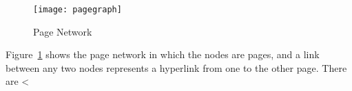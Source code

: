 \documentclass{scrartcl}
\begin{document}
\begin{figure}[htbp]
	\centering
	\texttt{[image: pagegraph]}
	\caption{Page Network}
	\label{fig:page_network}
\end{figure}

Figure~\ref{fig:page_network} shows the page network in which the nodes are pages, and a link between any two nodes represents a hyperlink from one to the other page. There are <%




\end{document}
